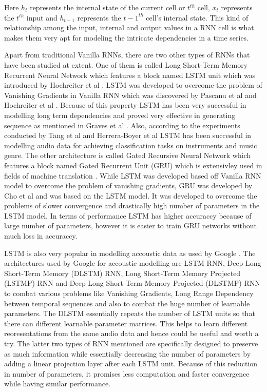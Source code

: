 \documentclass[letterpaper, 12 pt, conference]{ieeeconf}  %
\begin{document}
Here $h_t$ represents the internal state of the current cell or $t^{th}$ cell, $x_t$ represents the $t^{th}$ input and $h_{t-1}$ represents the ${t-1}^{th}$ cell's internal state. This kind of relationship among the input, internal and output values in a RNN cell is what makes them very apt for modeling the intricate dependencies in a time series.

Apart from traditional Vanilla RNNs, there are two other types of RNNs that have been studied at extent. One of them is called Long Short-Term Memory Recurrent Neural Network which features a block named LSTM unit which was introduced by Hochreiter et al \cite{lstm_intro}. LSTM was developed to overcome the problem of Vanishing Gradients in Vanilla RNN which was discovered by Pascanu et al\cite{vanishing_gradient} and Hochreiter et al \cite{lstm_intro}. Because of this property LSTM has been very successful in modelling long term dependencies and proved very effective in generating sequence as mentioned in Graves et al \cite{lstm_sequence_modelling}. Also, according to the experiments conducted by Tang et al \cite{lstm_music_genre} and Herrera-Boyer et al \cite{audio_classification} LSTM has been successful in modelling audio data for achieving classification tasks on instruments and music genre. The other architecture is called Gated Recursive Neural Network which features a block named Gated Recurrent Unit (GRU) which is extensivley used in fields of machine translation \cite{gru_translation}. While LSTM was developed based off Vanilla RNN model to overcome the problem of vanishing gradients, GRU was developed by Cho et al \cite{gru_translation} and was based on the LSTM model. It was developed to overcome the problems of slower convergence and drastically high number of parameters in the LSTM model. In terms of performance LSTM has higher accuraccy because of large number of parameters, however it is easier to train GRU networks without much loss in accuraccy. 

LSTM is also very popular in modelling accoustic data as used by Google \cite{google_accoustics}. The architectures used by Google for accoustic modelling \cite{google_accoustics} are LSTM RNN, Deep Long Short-Term Memory (DLSTM) RNN, Long Short-Term Memory Projected (LSTMP) RNN and Deep Long Short-Term Memory Projected (DLSTMP) RNN to combat various problems like Vanishing Gradients, Long Range Dependency between temporal sequences and also to combat the huge number of learnable parameters. The DLSTM essentially repeats the number of LSTM units so that there can different learnable parameter matrices. This helps to learn different reoresentations from the same audio data and hence could be useful and worth a try. The latter two types of RNN mentioned are specifically designed to preserve as much information while essentially decreasing the number of parameters by adding a linear projection layer \cite{google_accoustics} after each LSTM unit. Because of this reduction in number of parameters, it promises less computation and faster convergence while having similar performance.
\end{document}
